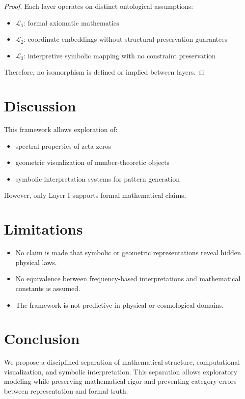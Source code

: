 \documentclass[11pt]{article}
\begin{document}
\begin{proof}
Each layer operates on distinct ontological assumptions:
\begin{itemize}
\item $\mathcal{L}_1$: formal axiomatic mathematics
\item $\mathcal{L}_2$: coordinate embeddings without structural preservation guarantees
\item $\mathcal{L}_3$: interpretive symbolic mapping with no constraint preservation
\end{itemize}
Therefore, no isomorphism is defined or implied between layers.
\end{proof}

\section{Discussion}

This framework allows exploration of:
\begin{itemize}
\item spectral properties of zeta zeros
\item geometric visualization of number-theoretic objects
\item symbolic interpretation systems for pattern generation
\end{itemize}

However, only Layer I supports formal mathematical claims.

\section{Limitations}

\begin{itemize}
\item No claim is made that symbolic or geometric representations reveal hidden physical laws.
\item No equivalence between frequency-based interpretations and mathematical constants is assumed.
\item The framework is not predictive in physical or cosmological domains.
\end{itemize}

\section{Conclusion}

We propose a disciplined separation of mathematical structure, computational visualization, and symbolic interpretation. This separation allows exploratory modeling while preserving mathematical rigor and preventing category errors between representation and formal truth.
\end{document}

